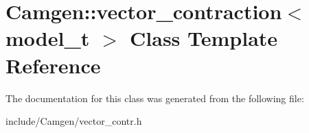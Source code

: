 \hypertarget{a00561}{\section{Camgen\-:\-:vector\-\_\-contraction$<$ model\-\_\-t $>$ Class Template Reference}
\label{a00561}
}


The documentation for this class was generated from the following file\-:\begin{DoxyCompactItemize}
\item 
include/\-Camgen/vector\-\_\-contr.\-h\end{DoxyCompactItemize}
